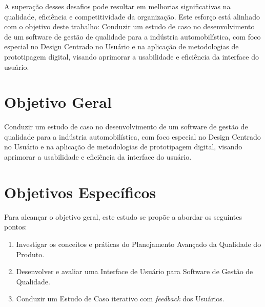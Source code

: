A superação desses desafios pode resultar em melhorias significativas na qualidade, eficiência e competitividade da organização. Este esforço está alinhado com o objetivo deste trabalho: Conduzir um estudo de caso no desenvolvimento de um software de gestão de qualidade para a indústria automobilística, com foco especial no Design Centrado no Usuário e na aplicação de metodologias de prototipagem digital, visando aprimorar a usabilidade e eficiência da interface do usuário.

\section{Objetivo Geral}

Conduzir um estudo de caso no desenvolvimento de um software de gestão de qualidade para a indústria automobilística, com foco especial no Design Centrado no Usuário e na aplicação de metodologias de prototipagem digital, visando aprimorar a usabilidade e eficiência da interface do usuário.

\section{Objetivos Específicos}

Para alcançar o objetivo geral, este estudo se propõe a abordar os seguintes pontos:

\begin{enumerate}
    \item Investigar os conceitos e práticas do Planejamento Avançado da Qualidade do Produto.

    \item Desenvolver e avaliar uma Interface de Usuário para Software de Gestão de Qualidade.

    \item Conduzir um Estudo de Caso iterativo com \textit{feedback} dos Usuários.

\end{enumerate}






